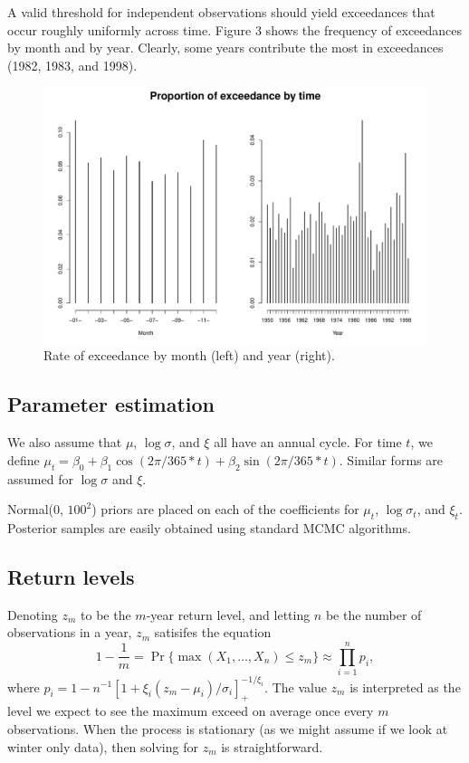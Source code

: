 \documentclass[12pt]{article}
\begin{document}
\noindent A valid threshold for independent observations should yield exceedances that occur roughly uniformly across time. Figure 3 shows the frequency of exceedances by month and by year. Clearly, some years contribute the most in exceedances (1982, 1983, and 1998). 

\begin{figure}[H]
\begin{center}
\includegraphics[scale=0.30]{../figs/exceedance_loc.pdf}
\end{center}
\caption{Rate of exceedance by month (left) and year (right).}
\end{figure}

\subsection*{Parameter estimation}

\noindent We also assume that $\mu$, $\log \sigma$, and $\xi$ all have an annual cycle. For time $t$, we define $\mu_t = \beta_0 + \beta_1 \cos(2\pi/365*t) + \beta_2\sin(2\pi/365*t)$. Similar forms are assumed for $\log \sigma$ and $\xi$.
\bigskip

\noindent Normal(0, $100^2$) priors are placed on each of the coefficients for $\mu_t$, $\log \sigma_t$, and $\xi_t$. Posterior samples are easily obtained using standard MCMC algorithms.

\subsection*{Return levels}

\noindent Denoting $z_m$ to be the $m$-year return level, and letting $n$ be the number of observations in a year, $z_m$ satisifes the equation
\[ 1-\frac{1}{m}=\Pr\{\max(X_1,\ldots,X_n)\leq z_m\} \approx \prod_{i=1}^n p_i, \]
\noindent where $p_i=1-n^{-1}[1+\xi_i(z_m-\mu_i)/\sigma_i]_+^{-1/\xi_i}$. The value $z_m$ is interpreted as the level we expect to see the maximum exceed on average once every $m$ observations. When the process is stationary (as we might assume if we look at winter only data), then solving for $z_m$ is straightforward.
\bigskip
\end{document}

